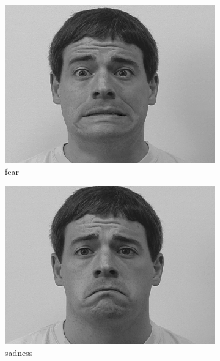 \begin{figure}
\begin{subfigure}[b]{0.22\textwidth}
		\includegraphics[width=\textwidth]{./img/dataset/fear.png}
		\caption{fear}
		\label{fig:dataset:fear}
	\end{subfigure}
	\begin{subfigure}[b]{0.22\textwidth}
		\includegraphics[width=\textwidth]{./img/dataset/sadness.png}
		\caption{sadness}
		\label{fig:dataset:sadness}
	\end{subfigure}
	\begin{subfigure}[b]{0.22\textwidth}

\end{subfigure}
\end{figure}
